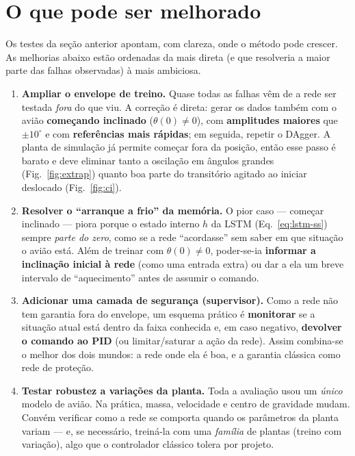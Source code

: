 \documentclass[11pt,a4paper]{article}
\begin{document}
\section{O que pode ser melhorado}
\label{sec:melhorias}

Os testes da seção anterior apontam, com clareza, onde o método pode crescer. As
melhorias abaixo estão ordenadas da mais direta (e que resolveria a maior parte das
falhas observadas) à mais ambiciosa.

\begin{enumerate}
  \item \textbf{Ampliar o envelope de treino.} Quase todas as falhas vêm de a rede ser
        testada \emph{fora} do que viu. A correção é direta: gerar os dados também com
        o avião \textbf{começando inclinado} ($\theta(0)\neq0$), com \textbf{amplitudes
        maiores} que $\pm10^\circ$ e com \textbf{referências mais rápidas}; em seguida,
        repetir o DAgger. A planta de simulação já permite começar fora da posição, então
        esse passo é barato e deve eliminar tanto a oscilação em ângulos grandes
        (Fig.~\ref{fig:extrap}) quanto boa parte do transitório agitado ao iniciar
        deslocado (Fig.~\ref{fig:ci}).

  \item \textbf{Resolver o ``arranque a frio'' da memória.} O pior caso --- começar
        inclinado --- piora porque o estado interno $h$ da LSTM (Eq.~\eqref{eq:lstm-ss})
        sempre \emph{parte do zero}, como se a rede ``acordasse'' sem saber em que
        situação o avião está. Além de treinar com $\theta(0)\neq0$, poder-se-ia
        \textbf{informar a inclinação inicial à rede} (como uma entrada extra) ou dar a
        ela um breve intervalo de ``aquecimento'' antes de assumir o comando.

  \item \textbf{Adicionar uma camada de segurança (supervisor).} Como a rede não tem
        garantia fora do envelope, um esquema prático é \textbf{monitorar} se a situação
        atual está dentro da faixa conhecida e, em caso negativo, \textbf{devolver o
        comando ao PID} (ou limitar/saturar a ação da rede). Assim combina-se o melhor
        dos dois mundos: a rede onde ela é boa, e a garantia clássica como rede de
        proteção.

  \item \textbf{Testar robustez a variações da planta.} Toda a avaliação usou um
        \emph{único} modelo de avião. Na prática, massa, velocidade e centro de
        gravidade mudam. Convém verificar como a rede se comporta quando os parâmetros da
        planta variam --- e, se necessário, treiná-la com uma \emph{família} de plantas
        (treino com variação), algo que o controlador clássico tolera por projeto.


\end{enumerate}
\end{document}

